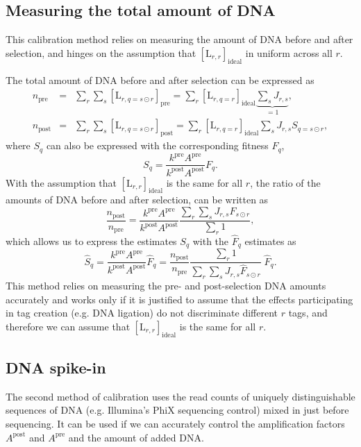 \documentclass[letter,10pt,oneside]{article}
\newcommand{\bel}{\begin{equation}}
\newcommand{\eel}{\end{equation}}
\newcommand{\bal}{\begin{eqnarray}}
\newcommand{\eal}{\end{eqnarray}}
\newcommand{\+}{^\dagger}
\begin{document}
\subsection{Measuring the total amount of DNA}
This calibration method relies on measuring the amount of DNA before and after selection, and hinges on the assumption that $[\text{L}_{r,r}]_\text{ideal}$ in uniform across all $r$.

The total amount of DNA before and after selection can be expressed as
\bal
  n_\text{pre} &=& \sum_r \sum_s [\text{L}_{r,q=s\odot r}]_\text{pre} = \sum_r [\text{L}_{r,q=r}]_\text{ideal} \underbrace{\sum_{s}J_{r,s}}_{=1}, \\
  n_\text{post} &=& \sum_r \sum_s [\text{L}_{r,q=s\odot r}]_\text{post} = \sum_r [\text{L}_{r,q=r}]_\text{ideal} \sum_s J_{r,s} S_{q = s\odot r},
\eal
where $S_q$ can also be expressed with the corresponding fitness $F_q$,
\bel
  S_q = \frac{k^\text{pre}A^\text{pre}}{k^\text{post}A^\text{post}} F_q.
\eel
With the assumption that $[\text{L}_{r,r}]_\text{ideal}$ is the same for all $r$, the ratio of the amounts of DNA before and after selection, can be written as
\bel
  \frac{n_\text{post}}{n_\text{pre}} = \frac{k^\text{pre}A^\text{pre}}{k^\text{post}A^\text{post}} \frac{\sum_r \sum_s J_{r,s} F_{s\odot r}}{\sum_r 1},
\eel
which allows us to express the estimates $S_q$ with the $\hat F_q$ estimates as
\bel
  \hat S_q = \frac{k^\text{pre}A^\text{pre}}{k^\text{post}A^\text{post}} \hat F_q = \frac{n_\text{post}}{n_\text{pre}} \frac{\sum_r 1}{\sum_r \sum_s J_{r,s} \hat F_{s\odot r}} \;\hat F_q.
\eel
This method relies on measuring the pre- and post-selection DNA amounts accurately and works only if it is justified to assume that the effects participating in tag creation (e.g. DNA ligation) do not discriminate different $r$ tags, and therefore we can assume that $[\text{L}_{r,r}]_\text{ideal}$ is the same for all $r$.

\subsection{DNA spike-in}
The second method of calibration uses the read counts of uniquely distinguishable sequences of DNA (e.g. Illumina's PhiX sequencing control) mixed in just before sequencing. It can be used if we can accurately control the amplification factors $A^\text{post}$ and $A^\text{pre}$ and the amount of added DNA.
\end{document}
